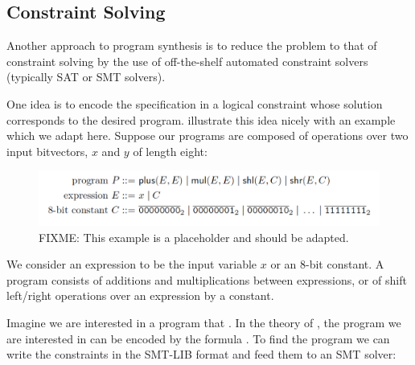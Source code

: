 \subsection{Constraint Solving}
\label{sec:constraint-solving}


Another approach to program synthesis is to reduce the problem to that of
constraint solving by the use of off-the-shelf automated constraint
solvers~\cite{Shi:2019:FCS,Feng:2018:PSU,Feng:2017:CST,Feng:2017:CSC,Solar-Lezama:2008,Jha:oracle:2010}
(typically SAT or SMT solvers).


One idea is to encode the specification in a logical constraint whose solution
corresponds to the desired program. \citeauthor{Gulwani2017} illustrate this
idea nicely with an example~\cite{Gulwani2017} which we adapt here.
Suppose our programs are composed of operations over two input bitvectors, $x$
and $y$ of length eight:

\begin{figure}[h!]
  \centering
  \includegraphics[width=\textwidth]{assets/constraint-solving-example.png}
  \caption{FIXME: This example is a placeholder and should be adapted.}
\end{figure}

We consider an expression to be the input variable $x$ or an 8-bit constant. A
program consists of additions and multiplications between expressions, or of
shift left/right operations over an expression by a constant.

Imagine we are interested in a program that . In the theory of
, the program we are interested in can be encoded
by the formula . To find the program we can write the constraints in the SMT-LIB format
and feed them to an SMT solver:

